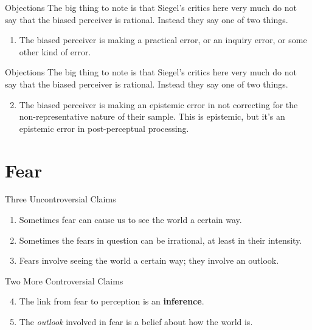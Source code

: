 \documentclass[
  17pt,
  letterpaper,
  ignorenonframetext,
  aspectratio=169,
  xcolor={dvipsnames}]{beamer}
\providecommand{\tightlist}{%
  \setlength{\itemsep}{0pt}\setlength{\parskip}{0pt}}\usepackage{longtable,booktabs,array}
\begin{document}
\begin{frame}{Objections}
\protect\hypertarget{objections}{}
The big thing to note is that Siegel's critics here very much do not say
that the biased perceiver is rational. Instead they say one of two
things.

\begin{enumerate}[<+->]
\tightlist
\item
  The biased perceiver is making a practical error, or an inquiry error,
  or some other kind of error.
\end{enumerate}
\end{frame}

\begin{frame}{Objections}
\protect\hypertarget{objections-1}{}
The big thing to note is that Siegel's critics here very much do not say
that the biased perceiver is rational. Instead they say one of two
things.

\begin{enumerate}[<+->]
\setcounter{enumi}{1}
\tightlist
\item
  The biased perceiver is making an epistemic error in not correcting
  for the non-representative nature of their sample. This is epistemic,
  but it's an epistemic error in post-perceptual processing.
\end{enumerate}
\end{frame}

\hypertarget{fear}{%
\section{Fear}\label{fear}}

\begin{frame}{Three Uncontroversial Claims}
\protect\hypertarget{three-uncontroversial-claims}{}
\begin{enumerate}[<+->]
\tightlist
\item
  Sometimes fear can cause us to see the world a certain way.
\item
  Sometimes the fears in question can be irrational, at least in their
  intensity.
\item
  Fears involve seeing the world a certain way; they involve an outlook.
\end{enumerate}
\end{frame}

\begin{frame}{Two More Controversial Claims}
\protect\hypertarget{two-more-controversial-claims}{}
\begin{enumerate}[<+->]
\setcounter{enumi}{3}
\tightlist
\item
  The link from fear to perception is an \textbf{inference}.
\item
  The \emph{outlook} involved in fear is a belief about how the world
  is.
\end{enumerate}
\end{frame}
\end{document}

